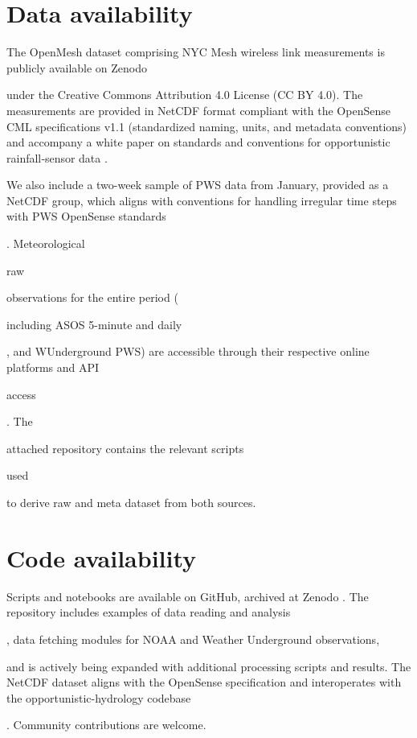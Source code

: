 \documentclass[manuscript]{copernicus}
\newif\ifshowrevisions
\newcommand{\blue}[1]{%
  \ifshowrevisions
    \textcolor{black}{#1}%
  \else
    #1%
  \fi
}
\begin{document}



\section{Data availability}\label{sec:data_availability}
The OpenMesh dataset comprising NYC Mesh wireless link measurements is publicly available on Zenodo \blue{\citep{Jacoby2025OpenMesh}} under the Creative Commons Attribution 4.0 License (CC BY 4.0).
The measurements are provided in NetCDF format compliant with the OpenSense CML specifications v1.1 (standardized naming, units, and metadata conventions) and accompany a white paper on standards and conventions for opportunistic rainfall‑sensor data \citep{fencl2023data}. \blue{We also include a two-week sample of PWS data from January, provided as a NetCDF group, which aligns with conventions for handling irregular time steps with PWS OpenSense standards \citep{fencl2023data}}. Meteorological \blue{raw} observations for the entire period (\blue{including ASOS 5-minute and daily}, and WUnderground PWS) are accessible through their respective online platforms and API \blue{access}. The \blue{attached repository contains the relevant scripts} \blue{used} to derive raw and meta dataset from both sources.


\section{Code availability}\label{sec:code_availability}
Scripts and notebooks are available on GitHub, archived at Zenodo \citep{jacoby2025code}. The repository includes examples of data reading and analysis\blue{, data fetching modules for NOAA and Weather Underground observations,} and is actively being expanded with additional processing scripts and results. The NetCDF dataset aligns with the OpenSense specification and interoperates with the opportunistic-hydrology codebase \blue{\citep{opensense_github}}. Community contributions are welcome.
\end{document}
